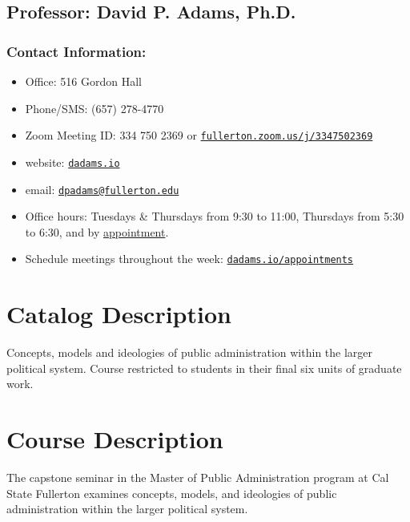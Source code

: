 \documentclass[12pt, letterpaper]{article}
\begin{document}
                    \subsection*{Professor: David P. Adams, Ph.D.}

                    \subsubsection*{Contact Information:}
                    
                    \begin{itemize}
                            \item Office: 516 Gordon Hall
                            \item Phone/SMS: (657) 278-4770
                            \item Zoom Meeting ID: 334 750 2369 or \href{https://fullerton.zoom.us/j/3347502369}{\texttt{fullerton.zoom.us/j/3347502369}} 
                            \item website: \href{https://dadams.io}{\texttt{dadams.io}}
                            \item email: \href{dpadams@fullerton.edu}{\texttt{dpadams@fullerton.edu}}
                            \item Office hours: Tuesdays \& Thursdays from 9:30 to 11:00, Thursdays from 5:30 to 6:30, and by \href{https://dadams.io/appointments}{appointment}.
                            \item Schedule meetings throughout the week: \href{https://dadams.io/appointments}{\texttt{dadams.io/appointments}}
                    \end{itemize}
                    
                    \section{Catalog Description}
                    Concepts, models and ideologies of public administration within the larger political system. Course restricted to students in their final six units of graduate work.
                    
                    \section{Course Description}
                    The capstone seminar in the Master of Public Administration program at Cal State Fullerton examines concepts, models, and ideologies of public administration within the larger political system.
\end{document}
